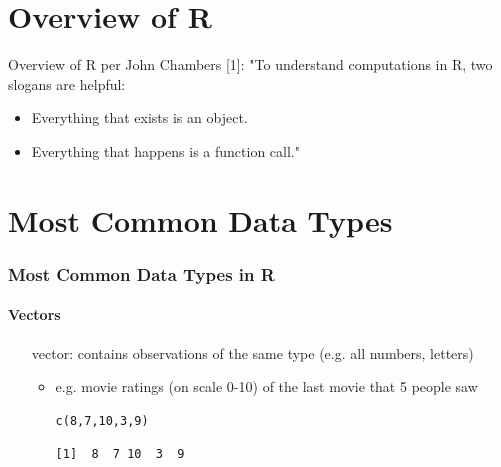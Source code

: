\section{Overview of R}
\begin{frame}
	\begin{center}
  		\begin{block}{Overview of R per John Chambers [1]:} 
			"To understand computations in R, two slogans are helpful:
			\begin{itemize}
			        \item Everything that exists is an object.
			        \item Everything that happens is a function call."
			\end{itemize}
		\end{block}
	\end{center} 

\end{frame}

\section[Data Types]{Most Common Data Types}
\begin{frame}[fragile]
	\frametitle{Most Common Data Types in R}
	\framesubtitle{Vectors}

	\begin{itemize}
		\item[vector:] contains observations of the same type (e.g. all numbers, letters)
			\begin{itemize}
				\item e.g. movie ratings (on scale 0-10) of the last movie that 5 people saw
				\begin{lstlisting}
c(8,7,10,3,9)
				\end{lstlisting} 
				\begin{verbatim}
[1]  8  7 10  3  9
				\end{verbatim}				
			\end{itemize}
	\end{itemize}
\end{frame}

